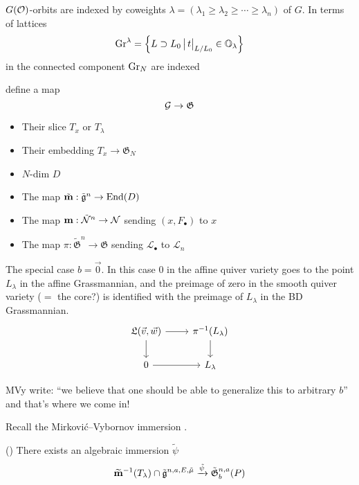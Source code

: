 \documentclass{article}
\begin{document}
$G(\mathcal O)$-orbits are indexed by coweights $\lambda = (\lambda_1\ge\lambda_2\ge\cdots\ge\lambda_n)$ of $G$. In terms of lattices 
\begin{equation}
    \label{eq:grlambdalat}
    \operatorname{Gr}^\lambda = \left\{L\supset L_0 \,\big|\, t\big|_{L/L_0} \in \mathbb O_\lambda \right\}
\end{equation} in the connected component $\operatorname{Gr}_N$ are indexed

\cite{mirkovic2007quiver} define a map 
\begin{equation}
    \label{eq:grbdingrc}
    \mathcal G \to \mathfrak{G}
\end{equation}

\begin{itemize}
    \item Their slice $T_x$ or $T_\lambda$
    \item Their embedding $T_x\to\mathfrak G_N$
    \item $N$-dim $D$
    \item The map $\tilde {\bf m}:\tilde{\mathfrak g}^{n}\to\operatorname{End}(D)$
    \item The map ${\bf m} : \tilde{\mathcal N}^n\to\mathcal N$ sending $(x,F_\bullet)$ to $x$
    \item The map $\pi: \tilde{\mathfrak G}^n\to \mathfrak G$ sending $\mathcal L_\bullet$ to $\mathcal L_n$
\end{itemize}


The special case $b = \vec 0$. In this case $0$ in the affine quiver variety goes to the point $L_\lambda$ in the affine Grassmannian, and the preimage of zero in the smooth quiver variety ($=$ the core?) is identified with the preimage of $L_\lambda$ in the BD Grassmannian. 
% 
\[
\begin{tikzcd}
    \mathfrak L(\vec v,\vec w) \ar[r] \ar[d] & \pi^{-1} (L_\lambda)\ar[d] \\
     0 \ar[r] & L_\lambda
\end{tikzcd}    
\]

MVy write: ``we believe that one should be able to generalize this to arbitrary $b$'' and that's where we come in!

Recall the Mirkovi\'c--Vybornov immersion \cite[Theorems 1.2 and 5.3]{mirkovic2007quiver}. 


\begin{theorem}(\cite[Theorem 1.2 and 5.3]{mirkovic2007quiver})
    There exists an algebraic immersion $\tilde\psi$ 
    $$\widetilde{\bf m}^{-1}(T_\lambda)\cap\tilde{\mathfrak g}^{n,a,E,\tilde\mu}\xrightarrow{\tilde\psi}\tilde{\mathfrak G}^{n,a}_{b}(P)$$
\end{theorem}
\end{document}
